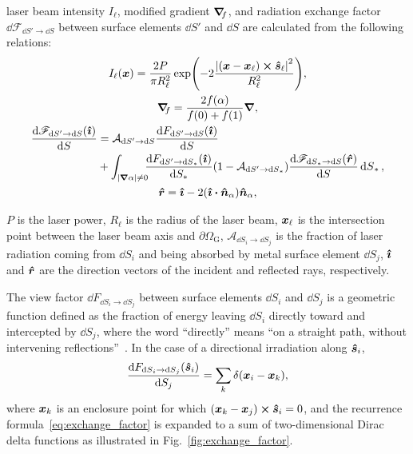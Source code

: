 \documentclass[final]{elsarticle} %
\newcommand{\gradf}[1]{\grad_{\!\! #1}}
\newcommand{\Abso}{\mathcal{A}}
\newcommand{\gas}{\text{G}}
\newcommand{\laser}{\ell} %
\newcommand{\viewfactor}[3]{{#1}_{\dd{S}#2\to\dd{S}#3}}
\newcommand{\dviewfactor}[4][]{{\dv{\viewfactor{#2}{#3}{#4}#1}{S#4}}}
\newcommand{\bn}{\vu*{n}}
\newcommand{\bs}{\vu*{s}}
\newcommand{\bi}{\vu*{\imath}}
\newcommand{\br}{\vu*{r}}
\newcommand{\bx}{\vb*{x}}
\begin{document}
laser beam intensity $I_\laser$, modified gradient $\gradf{f}$,
and radiation exchange factor $\dd\viewfactor{\mathscr{F}}{'}{}$ between surface elements $\dd{S'}$ and $\dd{S}$
are calculated from the following relations:
\begin{gather}
    I_\laser(\bx) = \frac{2P}{\pi R_\laser^2}
        \exp(-2\frac{\qty|(\bx-\bx_\laser)\cp\bs_\laser|^2}{R_\laser^2}), \label{eq:Ilaser}\\
    \gradf{f} = \frac{2f(\alpha)}{f(0)+f(1)}\grad, \label{eq:gradf}\\
    \begin{split}
        \dviewfactor[(\bi)]{\mathscr{F}}{'}{} &= \viewfactor{\Abso}{'}{}\dviewfactor[(\bi)]{F}{'}{} \\
        &+ \int_{|\grad\alpha|\neq0} \!\!\! \dviewfactor[(\bi)]{F}{'}{_*}\qty(1-\viewfactor{\Abso}{'}{_*})
            \dviewfactor[(\br)]{\mathscr{F}}{_*}{}\dd{S}_*,
    \end{split}\label{eq:exchange_factor}\\
    \br = \bi - 2(\bi\vdot\bn_\alpha)\bn_\alpha, \label{eq:reflection}
\end{gather}

$P$ is the laser power, $R_\laser$ is the radius of the laser beam,
$\bx_\laser$ is the intersection point between the laser beam axis and $\partial\Omega_\gas$,
$\viewfactor{\Abso}{_i}{_j}$ is the fraction of laser radiation coming from $\dd{S_i}$
and being absorbed by metal surface element $\dd{S_j}$,
$\bi$ and $\br$ are the direction vectors of the incident and reflected rays, respectively.

The view factor $\dd\viewfactor{F}{_i}{_j}$ between surface elements $\dd{S_i}$ and $\dd{S_j}$
is a geometric function defined as the fraction of energy leaving $\dd{S_i}$ directly toward
and intercepted by $\dd{S_j}$, where the word ``directly'' means ``on a straight path,
without intervening reflections''~\cite{modest2013radiative}.
In the case of a directional irradiation along $\bs_i$,
\begin{equation}\label{eq:view_factor}
    \dviewfactor[(\bs_i)]{F}{_i}{_j} = \sum_k\delta(\bx_i-\bx_k),
\end{equation}
where $\bx_k$ is an enclosure point for which $(\bx_k-\bx_j)\cp\bs_i = 0$,
and the recurrence formula~\eqref{eq:exchange_factor} is expanded to a sum of two-dimensional
Dirac delta functions as illustrated in Fig.~\ref{fig:exchange_factor}.
\end{document}

